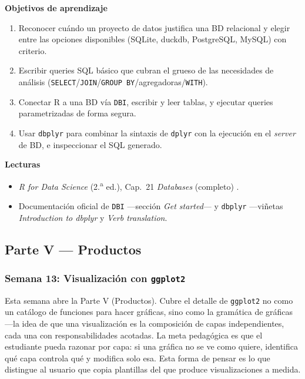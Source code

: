 \documentclass[11pt,letterpaper]{article}
\newcommand{\blue}[1]{{\color{cerulean}#1}}
\newcommand{\semana}[2]{%
  \subsubsection*{\color{main}Semana #1: #2}%
}
\begin{document}
\medskip
\noindent\textbf{Objetivos de aprendizaje}
\begin{enumerate}[leftmargin=*, itemsep=1pt]
    \item Reconocer cuándo un proyecto de datos justifica una BD relacional y elegir entre las opciones disponibles (SQLite, duckdb, PostgreSQL, MySQL) con criterio.
    \item Escribir queries SQL básico que cubran el grueso de las necesidades de análisis (\texttt{SELECT}/\texttt{JOIN}/\texttt{GROUP BY}/agregadoras/\texttt{WITH}).
    \item Conectar R a una BD vía \texttt{DBI}, escribir y leer tablas, y ejecutar queries parametrizadas de forma segura.
    \item Usar \texttt{dbplyr} para combinar la sintaxis de \texttt{dplyr} con la ejecución en el \textit{server} de BD, e inspeccionar el SQL generado.
\end{enumerate}

\medskip
\noindent\textbf{Lecturas}
\begin{itemize}[leftmargin=*, itemsep=1pt]
    \item \textit{R for Data Science} (2.\textsuperscript{a} ed.), Cap.\ 21 \textit{Databases} (completo) \cite{wickham2023r4ds}.
    \item Documentación oficial de \texttt{DBI} ---sección \textit{Get started}--- y \texttt{dbplyr} ---viñetas \textit{Introduction to dbplyr} y \textit{Verb translation}.
\end{itemize}

\subsection*{\color{main}Parte V --- Productos}

\semana{13}{Visualización con \texttt{ggplot2}}

Esta semana abre la Parte V (Productos). Cubre el detalle de \texttt{ggplot2} no como un catálogo de funciones para hacer gráficas, sino como la \blue{gramática de gráficas} ---la idea de que una visualización es la composición de capas independientes, cada una con responsabilidades acotadas. La meta pedagógica es que el estudiante pueda razonar por capa: si una gráfica no se ve como quiere, identifica qué capa controla qué y modifica solo esa. Esta forma de pensar es lo que distingue al usuario que copia plantillas del que produce visualizaciones a medida.
\end{document}
